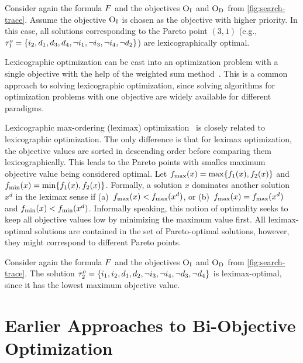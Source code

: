 \begin{example}
  Consider again the formula $F$ and the objectives $\textsc{O}_{\text{I}}$ and $\textsc{O}_{\text{D}}$ from \cref{fig:search-trace}.
  Assume the objective $\textsc{O}_{\text{I}}$ is chosen as the objective with higher priority.
  In this case, all solutions corresponding to the Pareto point $(3,1)$ (e.g., $\tau^o_1 = \{i_2,\allowbreak d_1,\allowbreak d_3,\allowbreak d_4,\allowbreak \lnot i_1,\allowbreak \lnot i_3,\allowbreak \lnot i_4,\allowbreak \lnot d_2\}$) are lexicographically optimal.
\end{example}

Lexicographic optimization can be cast into an optimization problem with a single objective with the help of the weighted sum method~\autocite{Ehrgott2005-3}.
This is a common approach to solving lexicographic optimization, since solving algorithms for optimization problems with one objective are widely available for different paradigms.

Lexicographic max-ordering (leximax) optimization~\autocite{Ehrgott2005-5} is closely related to lexicographic optimization.
The only difference is that for leximax optimization, the objective values are sorted in descending order before comparing them lexicographically.
This leads to the Pareto points with smalles maximum objective value being considered optimal.
Let $f_\text{max}(x) = \max\{f_1(x), f_2(x)\}$ and $f_\text{min}(x) = \min\{f_1(x), f_2(x)\}$.
Formally, a solution $x$ dominates another solution $x^d$ in the leximax sense if (a)~$f_\text{max}(x) < f_\text{max}(x^d)$, or (b)~$f_\text{max}(x) = f_\text{max}(x^d)$ and $f_\text{min}(x) < f_\text{min}(x^d)$.
Informally speaking, this notion of optimality seeks to keep all objective values low by minimizing the maximum value first.
All leximax-optimal solutions are contained in the set of Pareto-optimal solutions, however, they might correspond to different Pareto points.

\begin{example}
  Consider again the formula $F$ and the objectives $\textsc{O}_{\text{I}}$ and $\textsc{O}_{\text{D}}$ from \cref{fig:search-trace}.
  The solution $\tau^o_2 = \{i_1,\allowbreak i_2,\allowbreak d_1,\allowbreak d_2,\allowbreak \lnot i_3,\allowbreak \lnot i_4,\allowbreak \lnot d_3,\allowbreak \lnot d_4\}$ is leximax-optimal, since it has the lowest maximum objective value.
\end{example}

\section{Earlier Approaches to Bi-Objective Optimization\label{sec:approaches}}

